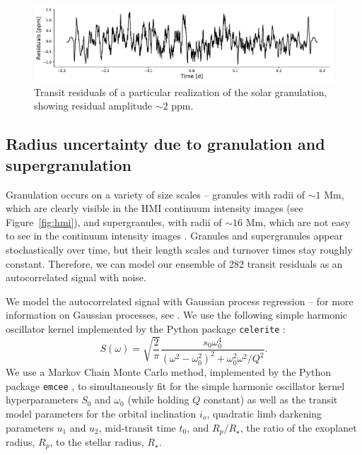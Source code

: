 \begin{figure}
    \centering
    \includegraphics[scale=0.6]{stash/example_residuals.pdf}
    \caption{Transit residuals of a particular realization of the solar granulation, showing residual amplitude $\sim 2$ ppm. }
    \label{fig:example_residuals}
\end{figure}

\subsection{Radius uncertainty due to granulation and supergranulation} \label{sec:gp}

Granulation occurs on a variety of size scales -- granules with radii of $\sim 1$ Mm, which are clearly visible in the HMI continuum intensity images (see Figure~\ref{fig:hmi}), and supergranules, with radii of $\sim 16$ Mm, which are not easy to see in the continuum intensity images \citep{Nordlund2009}. Granules and supergranules appear stochastically over time, but their length scales and turnover times stay roughly constant. Therefore, we can model our ensemble of 282 transit residuals as an autocorrelated signal with noise. 

We model the autocorrelated signal with Gaussian process regression -- for more information on Gaussian processes, see \citet{Rasmussen2006}. We use the following simple harmonic oscillator kernel implemented by the Python package \texttt{celerite} \citep{Foreman-Mackey2017}:
\begin{equation}
S(\omega) = \sqrt{\frac{2}{\pi}} \frac{s_0 \omega_0^{4}}{(\omega^2 - \omega_0^2)^2 + \omega_0^2\omega^{2}/Q^2}.
\label{eqn:sho}
\end{equation}
We use a Markov Chain Monte Carlo method, implemented by the Python package \texttt{emcee} \citep{Foreman-Mackey2013}, to simultaneously fit for the simple harmonic oscillator kernel hyperparameters $S_0$ and $\omega_0$ (while holding $Q$ constant) as well as the \citet{Mandel2002} transit model parameters for the orbital inclination $i_o$, quadratic limb darkening parameters $u_1$ and $u_2$, mid-transit time $t_0$, and $R_p/R_\star$, the ratio of the exoplanet radius, $R_p$, to the stellar radius, $R_\star$. 

